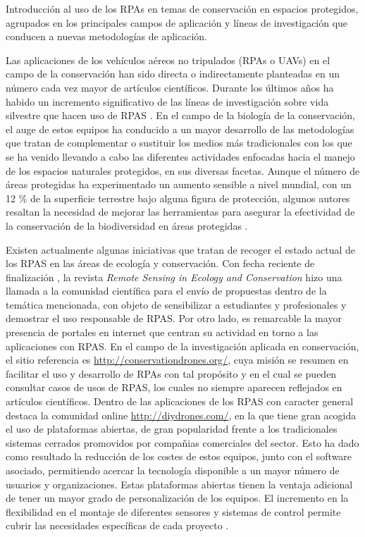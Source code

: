 \documentclass[11pt,]{article}
\begin{document}
Introducción al uso de los RPAs en temas de conservación en espacios
protegidos, agrupados en los principales campos de aplicación y líneas
de investigación que conducen a nuevas metodologías de aplicación.

Las aplicaciones de los vehículos aéreos no tripulados (RPAs o UAVs) en
el campo de la conservación han sido directa o indirectamente planteadas
en un número cada vez mayor de artículos científicos. Durante los
últimos años ha habido un incremento significativo de las líneas de
investigación sobre vida silvestre que hacen uso de RPAS
\citep{Linchant2015}. En el campo de la biología de la conservación, el
auge de estos equipos ha conducido a un mayor desarrollo de las
metodologías que tratan de complementar o sustituir los medios más
tradicionales con los que se ha venido llevando a cabo las diferentes
actividades enfocadas hacia el manejo de los espacios naturales
protegidos, en sus diversas facetas. Aunque el número de áreas
protegidas ha experimentado un aumento sensible a nivel mundial, con un
12 \% de la superficie terrestre bajo alguna figura de protección,
algunos autores resaltan la necesidad de mejorar las herramientas para
asegurar la efectividad de la conservación de la biodiversidad en áreas
protegidas \citep{Chape2005}.

Existen actualmente algunas iniciativas que tratan de recoger el estado
actual de los RPAS en las áreas de ecología y conservación. Con fecha
reciente de finalización , la revista \emph{Remote Sensing in Ecology
and Conservation} hizo una llamada a la comunidad científica para el
envío de propuestas dentro de la temática mencionada, con objeto de
sensibilizar a estudiantes y profesionales y demostrar el uso
responsable de RPAS. Por otro lado, es remarcable la mayor presencia de
portales en internet que centran su actividad en torno a las
aplicaciones con RPAS. En el campo de la investigación aplicada en
conservación, el sitio referencia es
\url{http://conservationdrones.org/}, cuya misión se resumen en
facilitar el uso y desarrollo de RPAs con tal propósito y en el cual se
pueden consultar casos de usos de RPAS, los cuales no siempre aparecen
reflejados en artículos científicos. Dentro de las aplicaciones de los
RPAS con caracter general destaca la comunidad online
\url{http://diydrones.com/}, en la que tiene gran acogida el uso de
plataformas abiertas, de gran popularidad frente a los tradicionales
sistemas cerrados promovidos por compañias comerciales del sector. Esto
ha dado como resultado la reducción de los costes de estos equipos,
junto con el software asociado, permitiendo acercar la tecnología
disponible a un mayor número de usuarios y organizaciones. Estas
plataformas abiertas tienen la ventaja adicional de tener un mayor grado
de personalización de los equipos. El incremento en la flexibilidad en
el montaje de diferentes sensores y sistemas de control permite cubrir
las necesidades específicas de cada proyecto \citep{Koh2012}.
\end{document}
